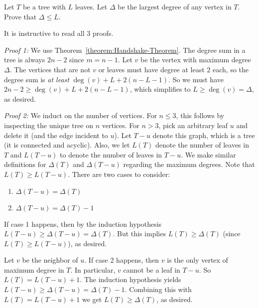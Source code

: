 \begin{flex}
\label{grp:exercise:Max-degree-is-at-most-number-of-leaves}

\begin{exercise}
\label{exercise:Max-degree-is-at-most-number-of-leaves}
Let $T$ be a tree with $L$ leaves. Let $\Delta$ be the largest degree of any vertex in $T$. Prove that $\Delta \leq L$.

\end{exercise}

\begin{solution}
\label{sol:intro-to-graph-theory::instructive}
It is instructive to read all 3 proofs.

\noindent
\emph{Proof 1:} We use Theorem~\ref{theorem:Handshake-Theorem}. The degree sum in a tree is always $2n - 2$ since $m = n-1$. Let $v$ be the vertex with maximum degree $\Delta$. The vertices that are not $v$ or leaves must have degree at least $2$ each, so the degree sum is \emph{at least} $\deg(v) + L + 2(n - L - 1)$. So we must have $2n - 2  \geq \deg(v) + L + 2(n - L - 1)$, which simplifies to $L \geq \deg(v) = \Delta$, as desired.

\noindent
\emph{Proof 2:} We induct on the number of vertices. For $n \leq 3$, this follows by inspecting the unique tree on $n$ vertices. For $n > 3$, pick an arbitrary leaf $u$ and delete it (and the edge incident to $u$). Let $T - u$ denote this graph, which is a tree (it is connected and acyclic). Also, we let $L(T)$ denote the number of leaves in $T$ and $L(T-u)$ to denote the number of leaves in $T-u$. We make similar definitions for $\Delta(T)$ and $\Delta(T-u)$ regarding the maximum degrees. Note that  $L(T) \geq L(T - u)$. There are two cases to consider:
\begin{enumerate}
    \item $\Delta(T - u) = \Delta(T)$ 
    \item $\Delta(T - u) = \Delta(T) - 1$
\end{enumerate}
If case 1 happens, then by the induction hypothesis $L(T - u) \geq \Delta(T-u) = \Delta(T)$. But this implies $L(T) \geq \Delta(T)$ (since $L(T) \geq L(T - u)$), as desired.

Let $v$ be the neighbor of $u$. If case 2 happens, then $v$ is the only vertex of maximum degree in $T$. In particular, $v$ cannot be a leaf in $T-u$. So $L(T) = L(T - u) + 1$. The induction hypothesis yields $L(T - u) \geq \Delta(T-u) = \Delta(T) - 1$. Combining this with $L(T) = L(T - u) + 1$ we get $L(T) \geq \Delta(T)$, as desired.


\end{solution}
\end{flex}
